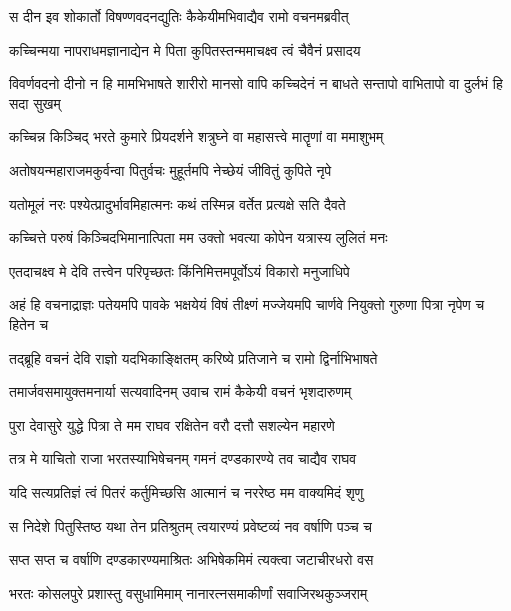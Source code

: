\twolineshloka
{स दीन इव शोकार्तो विषण्णवदनद्युतिः}
{कैकेयीमभिवाद्यैव रामो वचनमब्रवीत्} %

\twolineshloka
{कच्चिन्मया नापराधमज्ञानाद्येन मे पिता}
{कुपितस्तन्ममाचक्ष्व त्वं चैवैनं प्रसादय} %

\threelineshloka
{विवर्णवदनो दीनो न हि मामभिभाषते}
{शारीरो मानसो वापि कच्चिदेनं न बाधते}
{सन्तापो वाभितापो वा दुर्लभं हि सदा सुखम्} %

\twolineshloka
{कच्चिन्न किञ्चिद् भरते कुमारे प्रियदर्शने}
{शत्रुघ्ने वा महासत्त्वे मातॄणां वा ममाशुभम्} %

\twolineshloka
{अतोषयन्महाराजमकुर्वन्वा पितुर्वचः}
{मुहूर्तमपि नेच्छेयं जीवितुं कुपिते नृपे} %

\twolineshloka
{यतोमूलं नरः पश्येत्प्रादुर्भावमिहात्मनः}
{कथं तस्मिन्न वर्तेत प्रत्यक्षे सति दैवते} %

\twolineshloka
{कच्चित्ते परुषं किञ्चिदभिमानात्पिता मम}
{उक्तो भवत्या कोपेन यत्रास्य लुलितं मनः} %

\twolineshloka
{एतदाचक्ष्व मे देवि तत्त्वेन परिपृच्छतः}
{किंनिमित्तमपूर्वोऽयं विकारो मनुजाधिपे} %

\threelineshloka
{अहं हि वचनाद्राज्ञः पतेयमपि पावके}
{भक्षयेयं विषं तीक्ष्णं मज्जेयमपि चार्णवे}
{नियुक्तो गुरुणा पित्रा नृपेण च हितेन च} %

\twolineshloka
{तद्ब्रूहि वचनं देवि राज्ञो यदभिकाङ्क्षितम्}
{करिष्ये प्रतिजाने च रामो द्विर्नाभिभाषते} %

\twolineshloka
{तमार्जवसमायुक्तमनार्या सत्यवादिनम्}
{उवाच रामं कैकेयी वचनं भृशदारुणम्} %

\twolineshloka
{पुरा देवासुरे युद्धे पित्रा ते मम राघव}
{रक्षितेन वरौ दत्तौ सशल्येन महारणे} %

\twolineshloka
{तत्र मे याचितो राजा भरतस्याभिषेचनम्}
{गमनं दण्डकारण्ये तव चाद्यैव राघव} %

\twolineshloka
{यदि सत्यप्रतिज्ञं त्वं पितरं कर्तुमिच्छसि}
{आत्मानं च नररेष्ठ मम वाक्यमिदं शृणु} %

\twolineshloka
{स निदेशे पितुस्तिष्ठ यथा तेन प्रतिश्रुतम्}
{त्वयारण्यं प्रवेष्टव्यं नव वर्षाणि पञ्च च} %

\twolineshloka
{सप्त सप्त च वर्षाणि दण्डकारण्यमाश्रितः}
{अभिषेकमिमं त्यक्त्वा जटाचीरधरो वस} %

\twolineshloka
{भरतः कोसलपुरे प्रशास्तु वसुधामिमाम्}
{नानारत्नसमाकीर्णां सवाजिरथकुञ्जराम्} %


